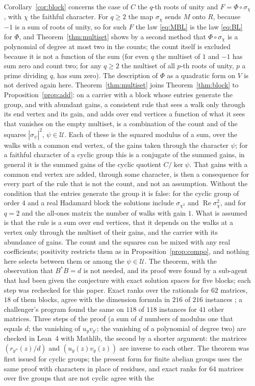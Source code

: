 Corollary~\ref{cor:block} concerns the case of $C$ the $q$-th roots of unity and $F=\Phi\circ\sigma_\chi$, with $\chi$ the faithful character. For $q\ge2$ the map $\sigma_\chi$ sends $M$ onto $R$, because $-1$ is a sum of roots of unity, so for such $F$ the law \eqref{eq:MBL} is the law \eqref{eq:BL} for $\Phi$, and Theorem~\ref{thm:multiset} shows by a second method that $\Phi\circ\sigma_\chi$ is a polynomial of degree at most two in the counts; the count itself is excluded because it is not a function of the sum (for even $q$ the multiset of $1$ and $-1$ has sum zero and count two; for any $q\ge2$ the multiset of all $p$-th roots of unity, $p$ a prime dividing $q$, has sum zero). The description of $\Phi$ as a quadratic form on $V$ is not derived again here. Theorem~\ref{thm:multiset} joins Theorem~\ref{thm:block} to Proposition~\ref{prop:add}: on a carrier with a block whose entries generate the group, and with abundant gains, a consistent rule that sees a walk only through its end vertex and its gain, and adds over end vertices a function of what it sees that vanishes on the empty multiset, is a combination of the count and of the squares $|\sigma_\psi|^2$, $\psi\in \mathcal{U}$. Each of these is the squared modulus of a sum, over the walks with a common end vertex, of the gains taken through the character $\psi$; for a faithful character of a cyclic group this is a conjugate of the summed gains, in general it is the summed gains of the cyclic quotient $C/\ker\psi$. That gains with a common end vertex are added, through some character, is then a consequence for every part of the rule that is not the count, and not an assumption. Without the condition that the entries generate the group it is false: for the cyclic group of order $4$ and a real Hadamard block the solutions include $\sigma_{\chi^2}$ and $\operatorname{Re}\sigma_\chi^2$, and for $q=2$ and the all-ones matrix the number of walks with gain $1$. What is assumed is that the rule is a sum over end vertices, that it depends on the walks at a vertex only through the multiset of their gains, and the carrier with its abundance of gains. The count and the squares can be mixed with any real coefficients; positivity restricts them as in Proposition~\ref{prop:compo}, and nothing here selects between them or among the $\psi\in \mathcal{U}$. The theorem, with the observation that $B^*B=d$ is not needed, and its proof were found by a sub-agent that had been given the conjecture with exact solution spaces for five blocks; each step was rechecked for this paper. Exact ranks over the rationals for $62$ matrices, $18$ of them blocks, agree with the dimension formula in $216$ of $216$ instances \cite{comp4s}; a challenger's program found the same on $118$ of $118$ instances for $41$ other matrices. Three steps of the proof (a sum of $d$ numbers of modulus one that equals $d$; the vanishing of $u_yv_{y'}$; the vanishing of a polynomial of degree two) are checked in Lean~4 with Mathlib, the second by a shorter argument: the matrices $(r_{y''}(z)/d)$ and $(u_y(z)v_y(z))$ are inverse to each other. The theorem was first issued for cyclic groups; the present form for finite abelian groups uses the same proof with characters in place of residues, and exact ranks for $64$ matrices over five groups that are not cyclic agree with the 